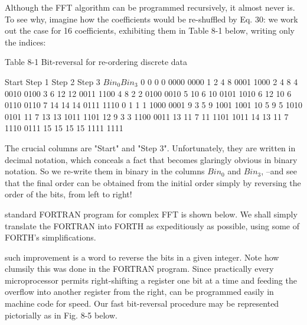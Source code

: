 Although the FFT algorithm can be programmed recursively, it almost never is. To see why, imagine how the coefficients would be re-shuffled by Eq. 30: we work out the case for 16 coefficients, exhibiting them in Table 8-1 below, writing only the indices:

Table 8-1 Bit-reversal for re-ordering discrete data

Start   Step 1  Step 2  Step 3    $Bin_0 Bin_3$
0       0       0       0         0000  0000
1       2       4       8         0001  1000
2       4       8       4         0010  0100
3       6       12      12        0011  1100
4       8       2       2         0100  0010
5       10      6       10        0101  1010
6       12      10      6         0110  0110
7       14      14      14        0111  1110
0       1       1       1         1000  0001
9       3       5       9         1001  1001
10      5       9       5         1010  0101
11      7       13      13        1011  1101
12      9       3       3         1100  0011
13      11      7       11        1101  1011
14      13      11      7         1110  0111
15      15      15      15        1111  1111

The crucial columns are "Start" and "Step 3". Unfortunately, they are written in decimal notation, which conceals a fact that becomes glaringly obvious in binary notation. So we re-write them in binary in the columns $Bin_0$ and $Bin_3$, --and see that the final order can be obtained from the initial order simply by reversing the order of the bits, from left to right!

 standard FORTRAN program for complex FFT is shown below. We shall simply translate the FORTRAN into FORTH as expeditiously as possible, using some of FORTH's simplifications.

 such improvement is a word to reverse the bits in a given integer. Note how clumsily this was done in the FORTRAN program. Since practically every microprocessor permits right-shifting a register one bit at a time and feeding the overflow into another register from the right,  can be programmed easily in machine code for speed. Our fast bit-reversal procedure  may be represented pictorially as in Fig. 8-5 below.


